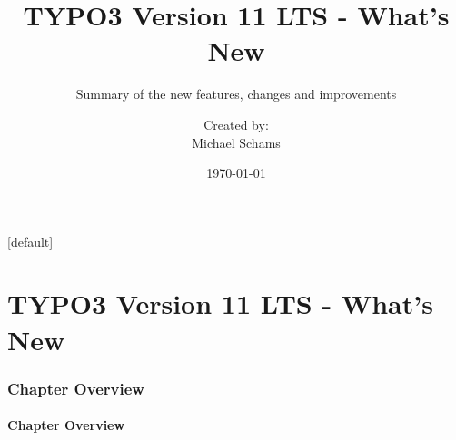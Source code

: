 \documentclass[t]{beamer}
\title{TYPO3 Version 11 LTS - What's New}
\subtitle{Summary of the new features, changes and improvements}
\author{
	\centerline{Created by:}
	\centerline{Michael Schams}
}
\date{\today}
\begin{document}
\sharefont


\begingroup
	[default]
	\begin{frame}
		\titlepage
	\end{frame}
\endgroup


\section*{TYPO3 Version 11 LTS - What's New}
\begin{frame}[fragile]
	\frametitle{Chapter Overview}
	\framesubtitle{Chapter Overview}

	\tableofcontents

\end{frame}









\end{document}
